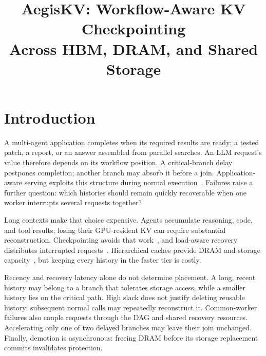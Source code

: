 \documentclass[sigplan,10pt,anonymous,nonacm]{acmart}
\title{AegisKV: Workflow-Aware KV Checkpointing\texorpdfstring{\\}{ }Across HBM, DRAM, and Shared Storage}
\begin{document}
\pagestyle{aegispreview}

\maketitle
\thispagestyle{aegispreview}
\raggedbottom

\section{Introduction}
\label{sec:introduction}

A multi-agent application completes when its required results are ready:
a tested patch, a report, or an answer assembled from parallel searches.
An LLM request's value therefore depends on its workflow position. A
critical-branch delay postpones completion; another branch may absorb it
before a join. Application-aware serving exploits this structure during
normal execution~\cite{lin2024parrot,pan2025kvflow,ni2026topas}. Failures
raise a further question: which histories should remain quickly
recoverable when one worker interrupts several requests together?

Long contexts make that choice expensive. Agents accumulate reasoning,
code, and tool results; losing their GPU-resident KV can require substantial
reconstruction. Checkpointing avoids that work~\cite{strati2024dejavu,jayakody2026ghostserve},
and load-aware recovery distributes interrupted requests~\cite{cao2026lumen}.
Hierarchical caches provide DRAM and storage capacity~\cite{qin2025mooncake,xie2026strata},
but keeping every history in the faster tier is costly.

Recency and recovery latency alone do not determine placement. A long,
recent history may belong to a branch that tolerates storage access,
while a smaller history lies on the critical path. High slack does not
justify deleting reusable history: subsequent normal calls may repeatedly
reconstruct it. Common-worker failures also couple requests through the
DAG and shared recovery resources. Accelerating only one of two delayed
branches may leave their join unchanged. Finally, demotion is asynchronous:
freeing DRAM before its storage replacement commits invalidates protection.
\end{document}
